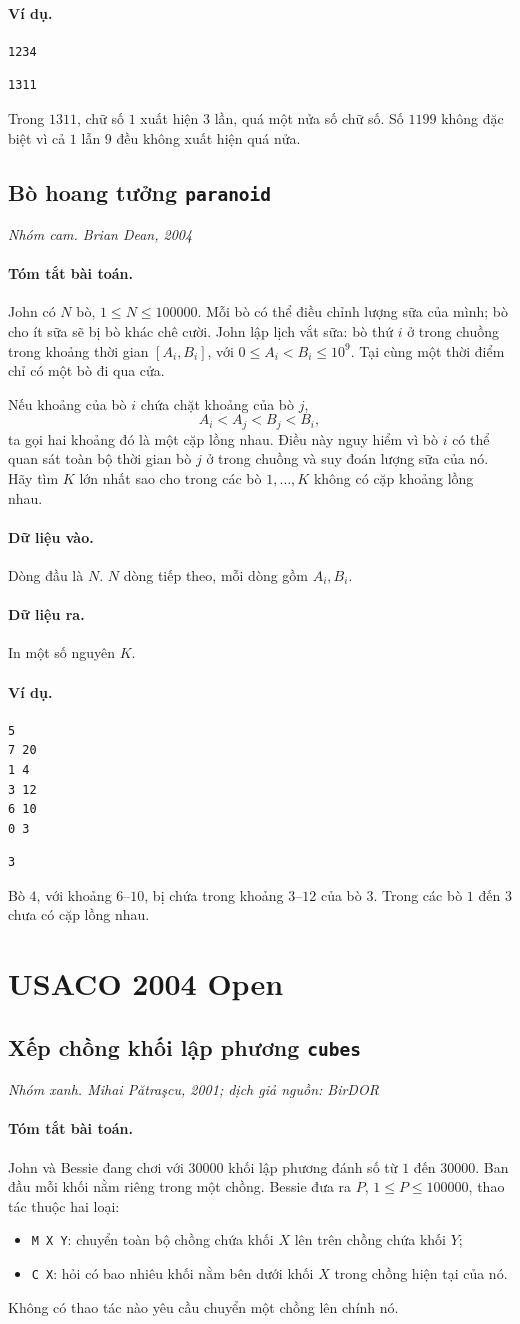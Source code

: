 \documentclass[11pt]{article}
\newcommand{\problem}[4]{%
  \subsection[#1 (#2)]{#1 \hfill {\normalsize\texttt{#2}}}%
  \noindent\textit{#3. #4}\par\smallskip
}
\newcommand{\iosec}[1]{\paragraph{#1}}
\begin{document}
\iosec{Ví dụ.}
\begin{verbatim}
1234
\end{verbatim}

\begin{verbatim}
1311
\end{verbatim}

Trong \(1311\), chữ số \(1\) xuất hiện \(3\) lần, quá một nửa số chữ số.
Số \(1199\) không đặc biệt vì cả \(1\) lẫn \(9\) đều không xuất hiện quá nửa.

\problem{Bò hoang tưởng}{paranoid}{Nhóm cam}{Brian Dean, 2004}

\iosec{Tóm tắt bài toán.}
John có \(N\) bò, \(1\le N\le 100000\). Mỗi bò có thể điều chỉnh lượng sữa
của mình; bò cho ít sữa sẽ bị bò khác chê cười. John lập lịch vắt sữa: bò
thứ \(i\) ở trong chuồng trong khoảng thời gian \([A_i,B_i]\), với
\(0\le A_i<B_i\le 10^9\). Tại cùng một thời điểm chỉ có một bò đi qua cửa.

Nếu khoảng của bò \(i\) chứa chặt khoảng của bò \(j\),
\[
  A_i<A_j<B_j<B_i,
\]
ta gọi hai khoảng đó là một cặp lồng nhau. Điều này nguy hiểm vì bò \(i\) có
thể quan sát toàn bộ thời gian bò \(j\) ở trong chuồng và suy đoán lượng sữa
của nó. Hãy tìm \(K\) lớn nhất sao cho trong các bò \(1,\ldots,K\) không có
cặp khoảng lồng nhau.

\iosec{Dữ liệu vào.}
Dòng đầu là \(N\). \(N\) dòng tiếp theo, mỗi dòng gồm \(A_i,B_i\).

\iosec{Dữ liệu ra.}
In một số nguyên \(K\).

\iosec{Ví dụ.}
\begin{verbatim}
5
7 20
1 4
3 12
6 10
0 3
\end{verbatim}

\begin{verbatim}
3
\end{verbatim}

Bò \(4\), với khoảng \(6\)--\(10\), bị chứa trong khoảng \(3\)--\(12\) của bò
\(3\). Trong các bò \(1\) đến \(3\) chưa có cặp lồng nhau.

\section{USACO 2004 Open}

\problem{Xếp chồng khối lập phương}{cubes}{Nhóm xanh}{Mihai Pătraşcu, 2001; dịch giả nguồn: BirDOR}

\iosec{Tóm tắt bài toán.}
John và Bessie đang chơi với \(30000\) khối lập phương đánh số từ \(1\) đến
\(30000\). Ban đầu mỗi khối nằm riêng trong một chồng. Bessie đưa ra
\(P\), \(1\le P\le 100000\), thao tác thuộc hai loại:
\begin{itemize}
  \item \texttt{M X Y}: chuyển toàn bộ chồng chứa khối \(X\) lên trên chồng
  chứa khối \(Y\);
  \item \texttt{C X}: hỏi có bao nhiêu khối nằm bên dưới khối \(X\) trong
  chồng hiện tại của nó.
\end{itemize}
Không có thao tác nào yêu cầu chuyển một chồng lên chính nó.
\end{document}
